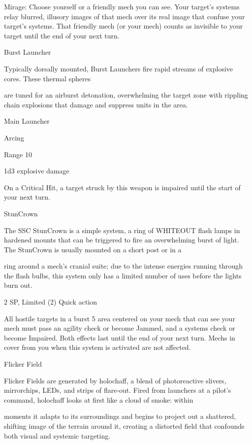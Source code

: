          Mirage: Choose yourself or a friendly mech you can see. Your target’s systems relay  
         blurred, illusory images of that mech over its real image that confuse your target’s  
         systems. That friendly mech (or your mech) counts as invisible to your target until the end  
         of your next turn.
 

Burst Launcher  

Typically dorsally mounted, Burst Launchers fire rapid streams of explosive cores. These thermal spheres  

are tuned for an airburst detonation, overwhelming the target zone with rippling chain explosions that  
damage and suppress units in the area.   

Main Launcher
 
Arcing
 
Range 10
 

                                                                                                                


1d3 explosive damage
 
On a Critical Hit, a target struck by this weapon is impaired until the start of your next turn.
 

StunCrown
 

The SSC StunCrown is a simple system, a ring of WHITEOUT flash lamps in hardened mounts that can be  
triggered to fire an overwhelming burst of light. The StunCrown is usually mounted on a short post or in a  

ring around a mech’s cranial suite; due to the intense energies running through the flash bulbs, this system  
only has a limited number of uses before the lights burn out.   

2 SP, Limited (2)  
Quick action  

All hostile targets in a burst 5 area centered on your mech that can see your mech must pass an  
agility check or become Jammed, and a systems check or become Impaired. Both effects last  
until the end of your next turn. Mechs in cover from you when this system is activated are not  
affected. 
 

Flicker Field  

Flicker Fields are generated by holochaff, a blend of photoreactive slivers, mirrorchips, LEDs, and strips of  
flare-out. Fired from launchers at a pilot’s command, holochaff looks at first like a cloud of smoke: within  

moments it adapts to its surroundings and begins to project out a shattered, shifting image of the terrain  
around it, creating a distorted field that confounds both visual and systemic targeting.     

